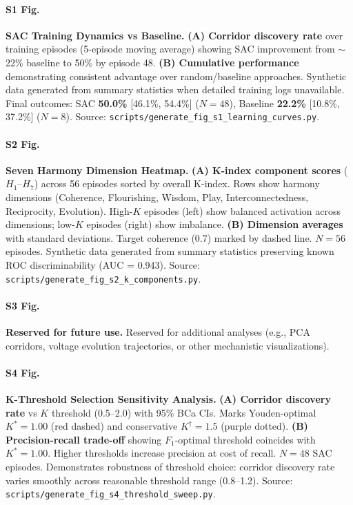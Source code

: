 \documentclass[10pt,letterpaper]{article}
\begin{document}
\paragraph*{S1 Fig.}
\label{S1_Fig}
\textbf{SAC Training Dynamics vs Baseline.}
\textbf{(A) Corridor discovery rate} over training episodes (5-episode moving average) showing SAC improvement from $\sim$22\% baseline to 50\% by episode 48.
\textbf{(B) Cumulative performance} demonstrating consistent advantage over random/baseline approaches.
Synthetic data generated from summary statistics when detailed training logs unavailable. Final outcomes: SAC \textbf{50.0\%} [46.1\%, 54.4\%] ($N = 48$), Baseline \textbf{22.2\%} [10.8\%, 37.2\%] ($N = 8$).
Source: \texttt{scripts/generate\_fig\_s1\_learning\_curves.py}.

\paragraph*{S2 Fig.}
\label{S2_Fig}
\textbf{Seven Harmony Dimension Heatmap.}
\textbf{(A) K-index component scores} ($H_1$–$H_7$) across 56 episodes sorted by overall K-index. Rows show harmony dimensions (Coherence, Flourishing, Wisdom, Play, Interconnectedness, Reciprocity, Evolution). High-$K$ episodes (left) show balanced activation across dimensions; low-$K$ episodes (right) show imbalance.
\textbf{(B) Dimension averages} with standard deviations. Target coherence (0.7) marked by dashed line.
$N = 56$ episodes. Synthetic data generated from summary statistics preserving known ROC discriminability (AUC = 0.943).
Source: \texttt{scripts/generate\_fig\_s2\_k\_components.py}.

\paragraph*{S3 Fig.}
\label{S3_Fig}
\textbf{Reserved for future use.}
Reserved for additional analyses (e.g., PCA corridors, voltage evolution trajectories, or other mechanistic visualizations).

\paragraph*{S4 Fig.}
\label{S4_Fig}
\textbf{K-Threshold Selection Sensitivity Analysis.}
\textbf{(A) Corridor discovery rate} vs $K$ threshold (0.5–2.0) with 95\% BCa CIs. Marks Youden-optimal $K^* = 1.00$ (red dashed) and conservative $K^\dagger = 1.5$ (purple dotted).
\textbf{(B) Precision-recall trade-off} showing $F_1$-optimal threshold coincides with $K^* = 1.00$. Higher thresholds increase precision at cost of recall.
$N = 48$ SAC episodes. Demonstrates robustness of threshold choice: corridor discovery rate varies smoothly across reasonable threshold range (0.8–1.2).
Source: \texttt{scripts/generate\_fig\_s4\_threshold\_sweep.py}.
\end{document}
